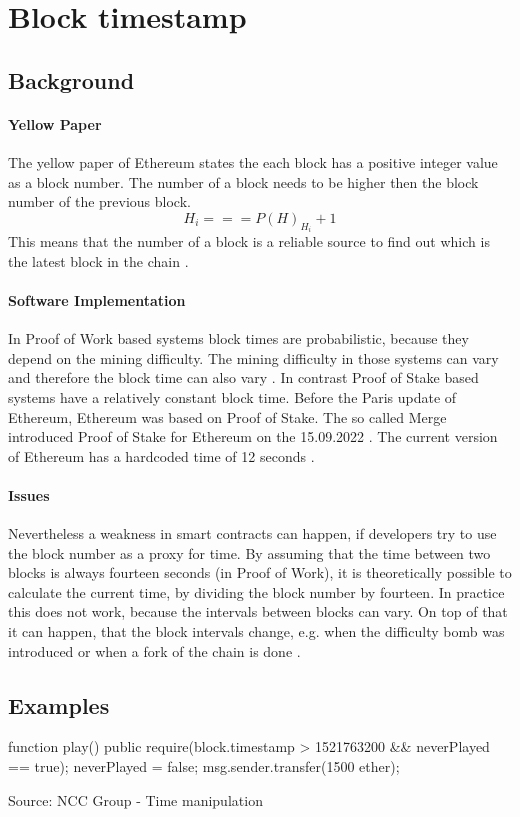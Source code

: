 \section{Block timestamp}

\subsection{Background}

\paragraph{Yellow Paper}
The yellow paper of Ethereum states the each block has a positive integer value as a block number.
The number of a block needs to be higher then the block number of the previous block.
\begin{equation} \label{eq:blocknumber}
    H_i === P(H)_{H_i} + 1
\end{equation}
This means that the number of a block is a reliable source to find out which is the latest block in the chain \cite{ethyellowpaper2023}.

\paragraph{Software Implementation}
In Proof of Work based systems block times are probabilistic, because they depend on the mining difficulty.
The mining difficulty in those systems can vary and therefore the block time can also vary \cite{eth_blocks}. \newline
In contrast Proof of Stake based systems have a relatively constant block time.
Before the Paris update of Ethereum, Ethereum was based on Proof of Stake. The so called Merge introduced Proof of Stake for Ethereum
on the 15.09.2022 \cite{eth_history}. The current version of Ethereum has a hardcoded time of 12 seconds \cite{eth_blocks}. \newline

\paragraph{Issues}
Nevertheless a weakness in smart contracts can happen, if developers try to use the block number as a proxy for time.
By assuming that the time between two blocks is always fourteen seconds (in Proof of Work), it is theoretically possible to
calculate the current time, by dividing the block number by fourteen. In practice this does not work,
because the intervals between blocks can vary. On top of that it can happen, that the
block intervals change, e.g. when the difficulty bomb was introduced or when a fork of the chain is done \cite{swc116}.

\subsection{Examples}
\begin{solidity} 
    function play() public {
        require(block.timestamp > 1521763200 && neverPlayed == true);
        neverPlayed = false;
        msg.sender.transfer(1500 ether);
    }
\end{solidity}
Source: NCC Group - Time manipulation \cite{DASP2018}